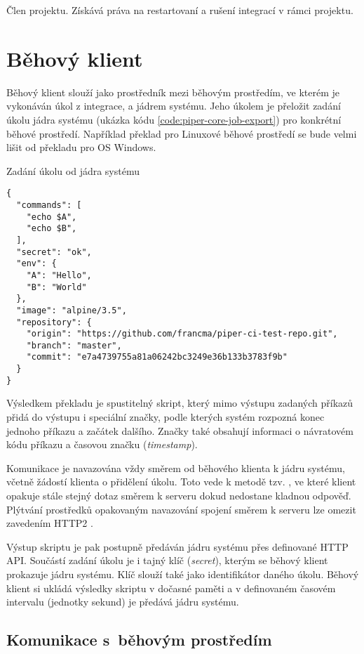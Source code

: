 Člen projektu.
Získává práva na restartovaní a rušení integrací v rámci projektu.

\section{Běhový klient}

Běhový klient slouží jako prostředník mezi běhovým prostředím, ve kterém je vykonáván úkol z integrace, a jádrem systému.
Jeho úkolem je přeložit zadání úkolu jádra systému (ukázka kódu \ref{code:piper-core-job-export}) pro konkrétní běhové prostředí.
Například překlad pro Linuxové běhové prostředí se bude velmi lišit od překladu pro OS Windows.

\begin{listing}[ht]
\caption{\label{code:piper-core-job-export}Zadání úkolu od jádra systému}
\begin{verbatim}
{
  "commands": [
    "echo $A",
    "echo $B",
  ],
  "secret": "ok",
  "env": {
    "A": "Hello",
    "B": "World"
  },
  "image": "alpine/3.5",
  "repository": {
    "origin": "https://github.com/francma/piper-ci-test-repo.git",
    "branch": "master",
    "commit": "e7a4739755a81a06242bc3249e36b133b3783f9b"
  }
}
\end{verbatim}
\end{listing}

Výsledkem překladu je spustitelný skript, který mimo výstupu zadaných příkazů přidá do výstupu i speciální značky, podle kterých systém rozpozná konec jednoho příkazu a začátek dalšího.
Značky také obsahují informaci o návratovém kódu příkazu a časovou značku (\textit{timestamp}).

Komunikace je navazována vždy směrem od běhového klienta k jádru systému, včetně žádostí klienta o přidělení úkolu.
Toto vede k metodě tzv. , ve které klient opakuje stále stejný dotaz směrem k serveru dokud nedostane kladnou odpověď.
Plýtvání prostředků opakovaným navazování spojení směrem k serveru lze omezit zavedením HTTP2 \cite{http2_rfc}. 

Výstup skriptu je pak postupně předáván jádru systému přes definované HTTP API.
Součástí zadání úkolu je i tajný klíč (\textit{secret}), kterým se běhový klient prokazuje jádru systému. 
Klíč slouží také jako identifikátor daného úkolu.
Běhový klient si ukládá výsledky skriptu v dočasné paměti a v definovaném časovém intervalu (jednotky sekund) je předává jádru systému.

\subsection{Komunikace s~běhovým prostředím}

